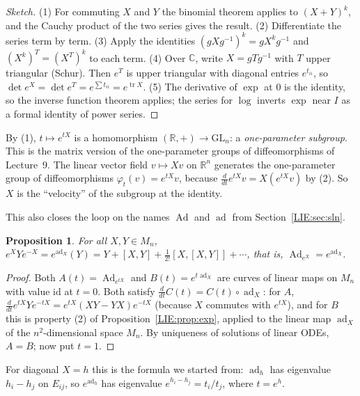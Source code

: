 \documentclass[11pt,openany]{book}
\theoremstyle{plain}
\newtheorem{proposition}[theorem]{Proposition}
\theoremstyle{definition}
\theoremstyle{remark}
\newcommand{\R}{\mathbb{R}}
\newcommand{\C}{\mathbb{C}}
\newcommand{\GL}{\mathrm{GL}}
\begin{document}
\begin{proof}[Sketch]
(1) For commuting $X$ and $Y$ the binomial theorem applies to $(X+Y)^k$, and the Cauchy product of the
two series gives the result. (2) Differentiate the series term by term. (3) Apply the identities
$(gXg^{-1})^k=gX^kg^{-1}$ and $(X^k)^T=(X^T)^k$ to each term. (4) Over $\C$, write $X=gTg^{-1}$ with
$T$ upper triangular (Schur). Then $e^T$ is upper triangular with diagonal entries $e^{t_{ii}}$, so
$\det e^X=\det e^T=e^{\sum t_{ii}}=e^{\operatorname{tr}X}$. (5) The derivative of $\exp$ at $0$ is the
identity, so the inverse function theorem applies; the series for $\log$ inverts $\exp$ near $I$ as a
formal identity of power series.
\end{proof}

By (1), $t\mapsto e^{tX}$ is a homomorphism $(\R,+)\to\GL_n$: a \emph{one-parameter subgroup}. This is
the matrix version of the one-parameter groups of diffeomorphisms of Lecture~9. The linear vector field $v\mapsto Xv$ on $\R^n$ generates the
one-parameter group of diffeomorphisms $\varphi_t(v)=e^{tX}v$, because $\frac{d}{dt}e^{tX}v=X(e^{tX}v)$
by (2). So $X$ is the ``velocity'' of the subgroup at the identity.

This also closes the loop on the names $\operatorname{Ad}$ and $\operatorname{ad}$ from
Section~\ref{LIE:sec:sln}.

\begin{proposition}\label{LIE:prop:Adad}
For all $X,Y\in M_n$, \ $e^{X}Ye^{-X}=e^{\operatorname{ad}_X}(Y)=Y+[X,Y]+\tfrac1{2!}[X,[X,Y]]+\cdots$,
that is, $\operatorname{Ad}_{e^X}=e^{\operatorname{ad}_X}$.
\end{proposition}

\begin{proof}
Both $A(t)=\operatorname{Ad}_{e^{tX}}$ and $B(t)=e^{t\operatorname{ad}_X}$ are curves of linear maps on $M_n$
with value $\mathrm{id}$ at $t=0$. Both satisfy $\frac{d}{dt}C(t)=C(t)\circ\operatorname{ad}_X$: for $A$,
$\frac{d}{dt}e^{tX}Ye^{-tX}=e^{tX}(XY-YX)e^{-tX}$ (because $X$ commutes with $e^{tX}$), and for $B$ this
is property (2) of Proposition~\ref{LIE:prop:exp}, applied to the linear map $\operatorname{ad}_X$ of the
$n^2$-dimensional space $M_n$. By uniqueness of solutions of linear ODEs, $A=B$; now put $t=1$.
\end{proof}

For diagonal $X=h$ this is the formula we started from: $\operatorname{ad}_h$ has eigenvalue $h_i-h_j$
on $E_{ij}$, so $e^{\operatorname{ad}_h}$ has eigenvalue $e^{h_i-h_j}=t_i/t_j$, where $t=e^h$.
\end{document}
